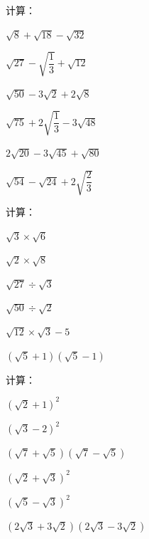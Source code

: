 \documentclass[a4paper,12pt]{ctexart}
\begin{document}
\begin{exercise}
\item 计算：
  \begin{subexercise}
    \item $\sqrt{8}+\sqrt{18}-\sqrt{32}$
    \item $\sqrt{27}-\sqrt{\dfrac{1}{3}}+\sqrt{12}$
    \item $\sqrt{50}-3\sqrt{2}+2\sqrt{8}$
    \item $\sqrt{75}+2\sqrt{\dfrac{1}{3}}-3\sqrt{48}$
    \item $2\sqrt{20}-3\sqrt{45}+\sqrt{80}$
    \item $\sqrt{54}-\sqrt{24}+2\sqrt{\dfrac{2}{3}}$
  \end{subexercise}

\item 计算：
  \begin{subexercise}
    \item $\sqrt{3}\times\sqrt{6}$
    \item $\sqrt{2}\times\sqrt{8}$
    \item $\sqrt{27}\div\sqrt{3}$
    \item $\sqrt{50}\div\sqrt{2}$
    \item $\sqrt{12}\times\sqrt{3}-5$
    \item $(\sqrt{5}+1)(\sqrt{5}-1)$
  \end{subexercise}

\item 计算：
  \begin{subexercise}
    \item $(\sqrt{2}+1)^2$
    \item $(\sqrt{3}-2)^2$
    \item $(\sqrt{7}+\sqrt{5})(\sqrt{7}-\sqrt{5})$
    \item $(\sqrt{2}+\sqrt{3})^2$
    \item $(\sqrt{5}-\sqrt{3})^2$
    \item $(2\sqrt{3}+3\sqrt{2})(2\sqrt{3}-3\sqrt{2})$
  \end{subexercise}
\end{exercise}

\newpage

\end{document}
